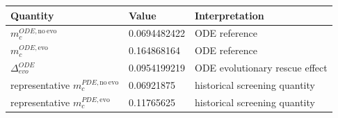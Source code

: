 \begin{tabular}{lll}
\toprule
Quantity & Value & Interpretation \\
\midrule
$m_c^{ODE,\mathrm{no\ evo}}$ & 0.0694482422 & ODE reference \\
$m_c^{ODE,\mathrm{evo}}$ & 0.164868164 & ODE reference \\
$\Delta_{evo}^{ODE}$ & 0.0954199219 & ODE evolutionary rescue effect \\
representative $m_c^{PDE,\mathrm{no\ evo}}$ & 0.06921875 & historical screening quantity \\
representative $m_c^{PDE,\mathrm{evo}}$ & 0.11765625 & historical screening quantity \\
\bottomrule
\end{tabular}
